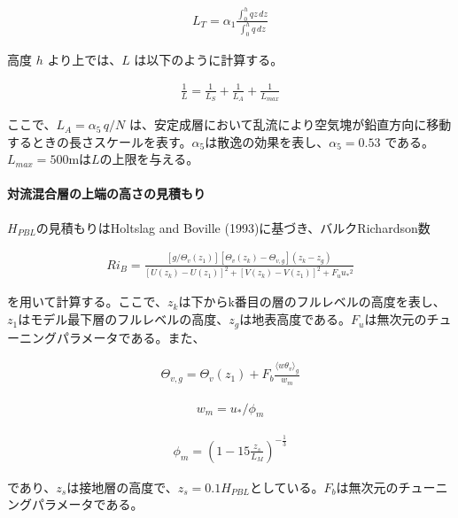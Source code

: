 \begin{eqnarray}L_T=\alpha_1\frac{\displaystyle \int_0^h{qz}\,dz}{\displaystyle \int_0^h{q}\,dz}\end{eqnarray}

高度 \(h\) より上では、\(L\) は以下のように計算する。

\begin{eqnarray}\frac{1}{L}=\frac{1}{L_S}+\frac{1}{L_A}+\frac{1}{L_{max}}\end{eqnarray}

ここで、\(L_A=\alpha_5\,q/N\) は、安定成層において乱流により空気塊が鉛直方向に移動するときの長さスケールを表す。\(\alpha_5\)は散逸の効果を表し、\(\alpha_5=0.53\) である。
\(L_{max}=500\)mは\(L\)の上限を与える。

\hypertarget{ux5bfeux6d41ux6df7ux5408ux5c64ux306eux4e0aux7aefux306eux9ad8ux3055ux306eux898bux7a4dux3082ux308a}{%
\paragraph{対流混合層の上端の高さの見積もり}\label{ux5bfeux6d41ux6df7ux5408ux5c64ux306eux4e0aux7aefux306eux9ad8ux3055ux306eux898bux7a4dux3082ux308a}}

\(H_{PBL}\)の見積もりはHoltslag and Boville (1993)に基づき、バルクRichardson数

\begin{eqnarray}Ri_B=\frac{[g/\Theta_v(z_1)][\Theta_v(z_k)-\Theta_{v,g}](z_k-z_g)}{[U(z_k)-U(z_1)]^2+[V(z_k)-V(z_1)]^2+F_u{u_*}^2}\end{eqnarray}

を用いて計算する。ここで、\(z_k\)は下からk番目の層のフルレベルの高度を表し、\(z_1\)はモデル最下層のフルレベルの高度、\(z_g\)は地表高度である。\(F_u\)は無次元のチューニングパラメータである。また、

\begin{eqnarray}\Theta_{v,g}=\Theta_v(z_1)+F_b \frac{\langle w\theta_v \rangle_g}{w_m}\end{eqnarray}

\begin{eqnarray}w_m=u_*/\phi_m\end{eqnarray}

\begin{eqnarray}\phi_m=\left(1-15\frac{z_s}{L_M}\right)^{-\frac{1}{3}}\end{eqnarray}

であり、\(z_s\)は接地層の高度で、\(z_s=0.1H_{PBL}\)としている。\(F_b\)は無次元のチューニングパラメータである。

